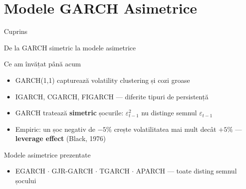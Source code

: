 \documentclass[9pt, aspectratio=169, t]{beamer}
\begin{document}
\section{Modele GARCH Asimetrice}

\begin{frame}{Cuprins}
    \small
    \vspace{-0.2cm}
    \tableofcontents[currentsection]
\end{frame}

\begin{frame}{De la GARCH simetric la modele asimetrice}
    \small
        \begin{block}{Ce am învățat până acum}
            \begin{itemize}
                \item GARCH(1,1) capturează volatility clustering și cozi groase
                \item IGARCH, CGARCH, FIGARCH --- diferite tipuri de persistență
            \end{itemize}
        \end{block}
        \vspace{-0.15cm}
        \begin{rmk}
            \begin{itemize}
                \item GARCH tratează \textbf{simetric} șocurile: $\varepsilon_{t-1}^2$ nu distinge semnul $\varepsilon_{t-1}$
                \item Empiric: un șoc negativ de $-5\%$ crește volatilitatea mai mult decât $+5\%$ --- \textbf{leverage effect} (Black, 1976)
            \end{itemize}
        \end{rmk}
        \vspace{-0.15cm}
        \begin{exampleblock}{Modele asimetrice prezentate}
            \begin{itemize}
                \item EGARCH $\cdot$ GJR-GARCH $\cdot$ TGARCH $\cdot$ APARCH --- toate disting semnul șocului
            \end{itemize}
        \end{exampleblock}
\end{frame}
\end{document}
